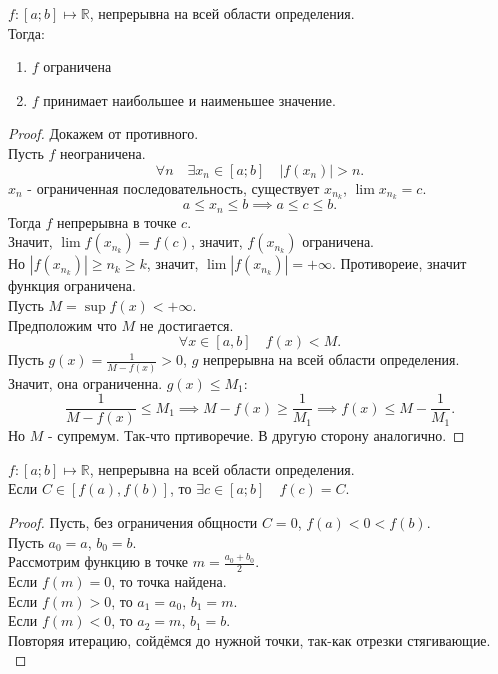 \documentclass[11pt, oneside]{article}   	%
\begin{document}
    \begin{theorem}
        $f: \left[a; b\right] \mapsto \mathbb{R}$, непрерывна на всей области определения.\\
        Тогда:
        \begin{enumerate}
            \item $f$ ограничена
            \item $f$ принимает наибольшее и наименьшее значение.
        \end{enumerate}
        \begin{proof}
           Докажем от противного.\\
           Пусть $f$ неограничена.\\
           \[ \forall{n}\quad \exists{x_n\in \left[a; b\right]}\quad |f(x_n)| > n .\]
           $x_n$ - ограниченная последовательность, существует $x _{n_k}$, $\lim x_{n_k} = c$.\\
           \[ a \le x_n \le b \implies a \le c \le b .\]
           Тогда $f$ непрерывна в точке $c$.\\
           Значит, $\lim f(x_{n_k}) = f(c) $, значит, $f(x_{n_k})$ ограничена.\\
           Но $|f(x_{n_k})| \ge n_k \ge k$, значит, $\lim |f(x_{n_k})| = +\infty$. Противореие, значит функция ограничена.\\
           Пусть $M = \sup f(x) < +\infty$.\\
           Предположим что $M$ не достигается.\\
           \[ \forall{x\in \left[a, b\right]}\quad f(x) < M .\]
           Пусть $g(x) = \frac{1}{M-f(x)} > 0$, $g$ непрерывна на всей области определения.\\
           Значит, она ограниченна. $g(x) \le M_1$:
           \[ \frac{1}{M-f(x)} \le M_1 \implies M - f(x) \ge \frac{1}{M_1} \implies f(x) \le M - \frac{1}{M_1} .\]
           Но $M$ - супремум. Так-что пртиворечие. В другую сторону аналогично.
        \end{proof}
    \end{theorem}
    \begin{theorem}
        $f: \left[a; b\right] \mapsto \mathbb{R}$, непрерывна на всей области определения.\\
        Если $C\in \left[f(a), f(b)\right]$, то $\exists{c\in \left[a; b\right]}\quad f(c)=C$.
        \begin{proof}
            Пусть, без ограничения общности $C=0$, $f(a)< 0 < f(b)$.\\
            Пусть $a_0 = a$, $b_0 = b$.\\
            Рассмотрим функцию в точке $m=\frac{a_0+b_0}{2}$.\\
            Если $f(m) = 0$, то точка найдена.\\
            Если $f(m) > 0$, то $a_1=a_0$, $b_1=m$.\\
            Если $f(m) < 0$, то $a_2=m$, $b_1=b$.\\
            Повторяя итерацию, сойдёмся до нужной точки, так-как отрезки стягивающие.\\
        \end{proof}
    \end{theorem}
\end{document}
